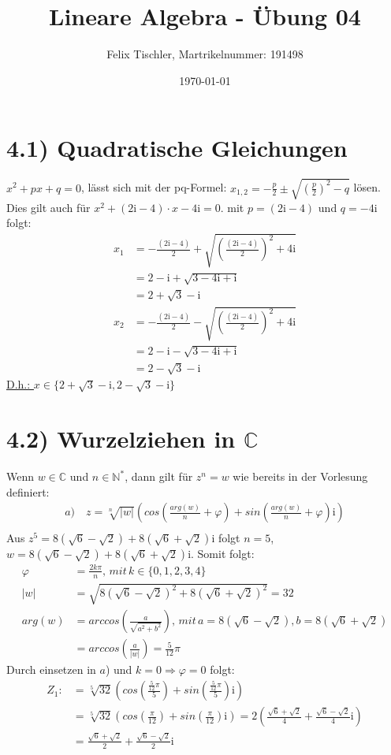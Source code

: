 \documentclass[titlepage]{article}
\begin{document}
	
	\title{Lineare Algebra - Übung 04}
	\author{Felix Tischler, Martrikelnummer: 191498}
	\date{\today}
	\maketitle
	
	\section*{4.1) Quadratische Gleichungen}
	$x^2+px+q=0$, lässt sich mit der pq-Formel: $x_{1,2}=-\frac{p}{2}\pm \sqrt{(\frac{p}{2})^2-q}$ lösen. Dies gilt auch für $x^2+(2\text{i}-4)\cdot x-4\text{i}=0$. mit $p=(2\text{i}-4)$ und $q=-4\text{i}$ folgt:
		\begin{align*}
			x_1&=-\frac{(2\text{i}-4)}{2}+\sqrt{\left(\frac{(2\text{i}-4)}{2}\right)^2+4\text{i}}\\
			&=2-\text{i}+\sqrt{3-4\text{i}+\text{i}}\\
			&=2+\sqrt{3}-\text{i}\\
			x_2&=-\frac{(2\text{i}-4)}{2}-\sqrt{\left(\frac{(2\text{i}-4)}{2}\right)^2+4\text{i}}\\
			&=2-\text{i}-\sqrt{3-4\text{i}+\text{i}}\\
			&=2-\sqrt{3}-\text{i}
		\end{align*}
	\underline{\underline{	D.h.: $x\in\{2+\sqrt{3}-\mathrm{i},2-\sqrt{3}-\mathrm{i}\}$}}
	\section*{4.2) Wurzelziehen in $\mathbb{C}$}
		Wenn $w\in\mathbb{C}$ und $n\in\mathbb{N}^*$, dann gilt für $z^n=w$ wie bereits in der Vorlesung definiert:
		\begin{align*}
			a)\quad z=\sqrt[n]{|w|}\left(cos(\frac{arg(w)}{n}+\varphi)+sin(\frac{arg(w)}{n}+\varphi)\mathrm{i} \right)\\
		\end{align*}
		Aus $z^5=8(\sqrt{6}-\sqrt{2})+8(\sqrt{6}+\sqrt{2})\mathrm{i}$ folgt $n=5$, $w=8(\sqrt{6}-\sqrt{2})+8(\sqrt{6}+\sqrt{2})\mathrm{i}$. Somit folgt:
		\begin{align*}
			\varphi&=\frac{2k\pi}{n},\, mit\,k\in\{0,1,2,3,4\}\\
			|w|&=\sqrt{8(\sqrt{6}-\sqrt{2})^2+8(\sqrt{6}+\sqrt{2})^2}=32\\
			arg(w)&=arccos\left(\frac{a}{\sqrt{a^2+b^2}}\right),\,mit\,a=8(\sqrt{6}-\sqrt{2}),b=8(\sqrt{6}+\sqrt{2})\\
			&=arccos\left(\frac{a}{|w|}\right)=\frac{5}{12}\pi
		\end{align*}
	Durch einsetzen in $a$) und $k=0\Rightarrow\varphi=0$ folgt:
	\begin{align*}
		Z_1:&=\sqrt[5]{32}\left(cos(\frac{\frac{5}{12}\pi}{5})+sin(\frac{\frac{5}{12}\pi}{5})\mathrm{i}\right)\\
		&=\sqrt[5]{32}\left(cos(\frac{\pi}{12})+sin(\frac{\pi}{12})\mathrm{i}\right) = 2\left(\frac{\sqrt{6}+\sqrt{2}}{4}+\frac{\sqrt{6}-\sqrt{2}}{4}\mathrm{i}\right)\\
		&=\frac{\sqrt{6}+\sqrt{2}}{2}+\frac{\sqrt{6}-\sqrt{2}}{2}\mathrm{i}
	\end{align*}
\end{document}
